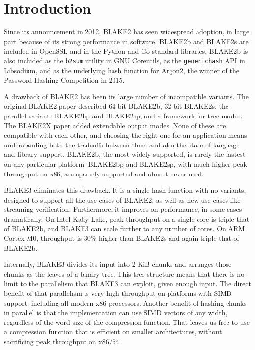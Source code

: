 \documentclass[11pt,notitlepage,a4paper]{article}
\begin{document}
\smallskip

\section{Introduction}\label{sec:intro}

Since its announcement in 2012, BLAKE2 has seen widespread adoption, in large
part because of its strong performance in software. BLAKE2b and BLAKE2s are
included in OpenSSL and in the Python and Go standard libraries. BLAKE2b is
also included as the \texttt{b2sum} utility in GNU Coreutils, as the
\texttt{generichash} API in Libsodium, and as the underlying hash function for
Argon2, the winner of the Password Hashing Competition in 2015.

A drawback of BLAKE2 has been its large number of incompatible variants. The
original BLAKE2 paper described 64-bit BLAKE2b, 32-bit BLAKE2s, the parallel
variants BLAKE2bp and BLAKE2sp, and a framework for tree modes. The BLAKE2X
paper added extendable output modes. None of these are compatible with each
other, and choosing the right one for an application means understanding both
the tradeoffs between them and also the state of language and library support.
BLAKE2b, the most widely supported, is rarely the fastest on any particular
platform. BLAKE2bp and BLAKE2sp, with much higher peak throughput on x86, are
sparsely supported and almost never used.

BLAKE3 eliminates this drawback. It is a single hash function with no variants,
designed to support all the use cases of BLAKE2, as well as new use cases like
streaming verification. Furthermore, it improves on performance, in some cases
dramatically. On Intel Kaby Lake, peak throughput on a single core is triple
that of BLAKE2b, and BLAKE3 can scale further to any number of cores. On ARM
Cortex-M0, throughput is 30\% higher than BLAKE2s and again triple that of
BLAKE2b.

Internally, BLAKE3 divides its input into 2 KiB chunks and arranges those
chunks as the leaves of a binary tree. This tree structure means that there is
no limit to the parallelism that BLAKE3 can exploit, given enough input. The
direct benefit of that parallelism is very high throughput on platforms with
SIMD support, including all modern x86 processors. Another benefit of hashing
chunks in parallel is that the implementation can use SIMD vectors of any
width, regardless of the word size of the compression function. That leaves us
free to use a compression function that is efficient on smaller architectures,
without sacrificing peak throughput on x86\=/64.
\end{document}
